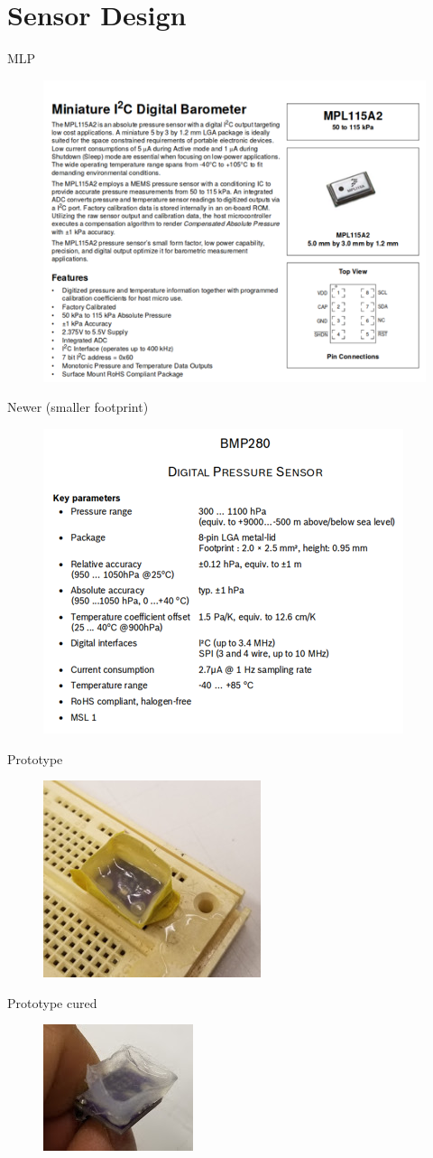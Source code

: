 \documentclass[preprint,12pt,3p]{elsarticle}
\begin{document}
\section{Sensor Design}


MLP
\begin{figure}[H]
\centering
\includegraphics[width=.5\textwidth]{images/sensor/old_datasheet.png}
\end{figure}

Newer (smaller footprint)
\begin{figure}[H]
\centering
\includegraphics[width=.5\textwidth]{images/sensor/new_datasheet.png}
\end{figure}

Prototype
\begin{figure}[H]
\centering
\includegraphics[width=.3\textwidth]{images/sensor/sensor.jpg}
\end{figure}


Prototype cured
\begin{figure}[H]
\centering
\includegraphics[width=.3\textwidth]{images/sensor/sensor2.jpg}
\end{figure}
\end{document}
